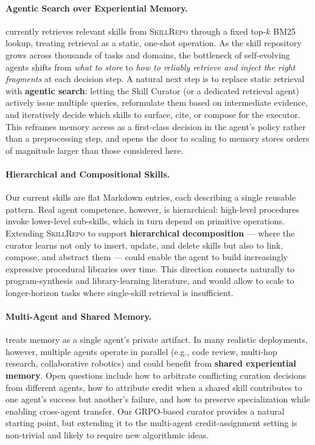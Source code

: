 \paragraph{Agentic Search over Experiential Memory.}
\ours{} currently retrieves relevant skills from \textsc{SkillRepo} through a fixed top-$k$ BM25 lookup, treating retrieval as a static, one-shot operation. As the skill repository grows across thousands of tasks and domains, the bottleneck of self-evolving agents shifts from \textit{what to store} to \textit{how to reliably retrieve and inject the right fragments} at each decision step. A natural next step is to replace static retrieval with \textbf{agentic search}: letting the Skill Curator (or a dedicated retrieval agent) actively issue multiple queries, reformulate them based on intermediate evidence, and iteratively decide which skills to surface, cite, or compose for the executor. This reframes memory access as a first-class decision in the agent's policy rather than a preprocessing step, and opens the door to scaling \ours{} to memory stores orders of magnitude larger than those considered here.

\paragraph{Hierarchical and Compositional Skills.}
Our current skills are flat Markdown entries, each describing a single reusable pattern. Real agent competence, however, is hierarchical: high-level procedures invoke lower-level sub-skills, which in turn depend on primitive operations. Extending \textsc{SkillRepo} to support \textbf{hierarchical decomposition} --- where the curator learns not only to insert, update, and delete skills but also to link, compose, and abstract them --- could enable the agent to build increasingly expressive procedural libraries over time. This direction connects naturally to program-synthesis and library-learning literature, and would allow \ours{} to scale to longer-horizon tasks where single-skill retrieval is insufficient.

\paragraph{Multi-Agent and Shared Memory.}
\ours{} treats memory as a single agent's private artifact. In many realistic deployments, however, multiple agents operate in parallel (e.g., code review, multi-hop research, collaborative robotics) and could benefit from \textbf{shared experiential memory}. Open questions include how to arbitrate conflicting curation decisions from different agents, how to attribute credit when a shared skill contributes to one agent's success but another's failure, and how to preserve specialization while enabling cross-agent transfer. Our GRPO-based curator provides a natural starting point, but extending it to the multi-agent credit-assignment setting is non-trivial and likely to require new algorithmic ideas.

